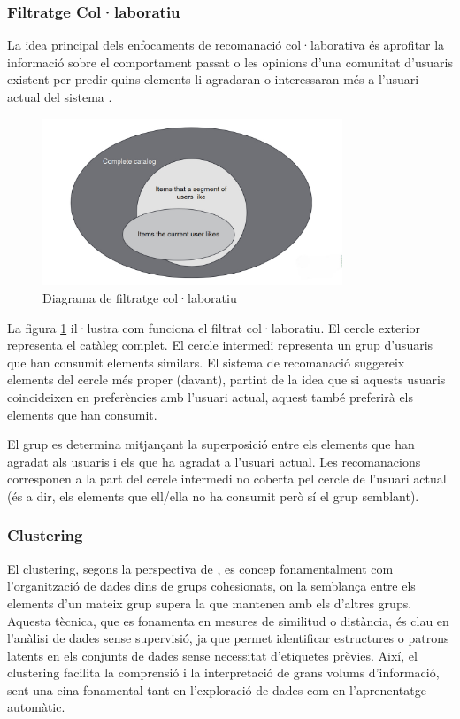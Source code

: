 \documentclass[a4paper,12pt]{report}
\begin{document}
\subsubsection{Filtratge Col·laboratiu}

La idea principal dels enfocaments de recomanació col·laborativa és aprofitar la informació sobre el comportament passat o les opinions d'una comunitat d'usuaris existent per predir quins elements li agradaran o interessaran més a l'usuari actual del sistema \cite{Jannach2011}.

\begin{figure}[h]
    \centering
    \includegraphics[width=0.8\textwidth]{Figuras/DiagramaFiltratgeCol.jpg}
    \caption{Diagrama de filtratge col·laboratiu \cite{falk2019practical}}
    \label{fig:collaborative-filtering-diagram}
\end{figure}

La figura \ref{fig:collaborative-filtering-diagram} il·lustra com funciona el filtrat col·laboratiu. El cercle exterior representa el catàleg complet. El cercle intermedi representa un grup d'usuaris que han consumit elements similars. El sistema de recomanació suggereix elements del cercle més proper (davant), partint de la idea que si aquests usuaris coincideixen en preferències amb l’usuari actual, aquest també preferirà els elements que han consumit.

El grup es determina mitjançant la superposició entre els elements que han agradat als usuaris i els que ha agradat a l’usuari actual. Les recomanacions corresponen a la part del cercle intermedi no coberta pel cercle de l’usuari actual (és a dir, els elements que ell/ella no ha consumit però sí el grup semblant).


\subsubsection{Clustering}

El clustering, segons la perspectiva de \cite{jain2008data}, es concep fonamentalment com l'organització de dades dins de grups cohesionats, on la semblança entre els elements d'un mateix grup supera la que mantenen amb els d'altres grups.
Aquesta tècnica, que es fonamenta en mesures de similitud o distància, és clau en l’anàlisi de dades sense supervisió, ja que permet identificar estructures o patrons latents en els conjunts de dades sense necessitat d’etiquetes prèvies. Així, el clustering facilita la comprensió i la interpretació de grans volums d’informació, sent una eina fonamental tant en l’exploració de dades com en l’aprenentatge automàtic. 
\end{document}

